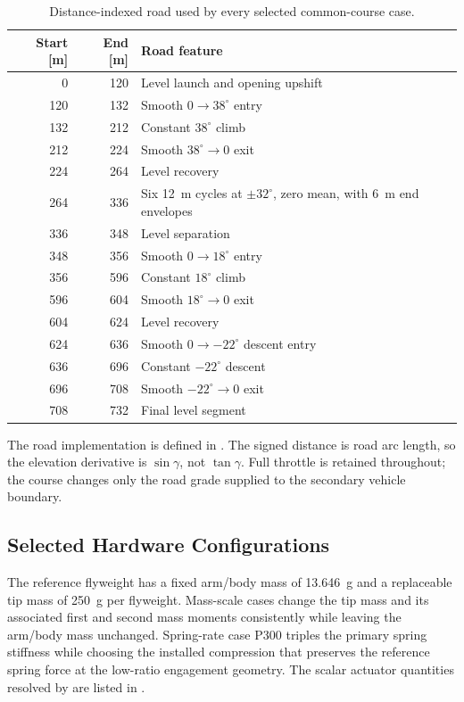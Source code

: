 \documentclass[11pt]{report}
\numberwithin{equation}{section}
\begin{document}
\begin{table}[H]
\centering
\small
\begin{tabular}{@{}r r p{}@{}}
\toprule
Start [m] & End [m] & Road feature \\
\midrule
0 & 120 & Level launch and opening upshift \\
120 & 132 & Smooth \(0\rightarrow38^\circ\) entry \\
132 & 212 & Constant \(38^\circ\) climb \\
212 & 224 & Smooth \(38^\circ\rightarrow0\) exit \\
224 & 264 & Level recovery \\
264 & 336 & Six \SI{12}{m} cycles at \(\pm32^\circ\), zero mean, with \SI{6}{m} end envelopes \\
336 & 348 & Level separation \\
348 & 356 & Smooth \(0\rightarrow18^\circ\) entry \\
356 & 596 & Constant \(18^\circ\) climb \\
596 & 604 & Smooth \(18^\circ\rightarrow0\) exit \\
604 & 624 & Level recovery \\
624 & 636 & Smooth \(0\rightarrow-22^\circ\) descent entry \\
636 & 696 & Constant \(-22^\circ\) descent \\
696 & 708 & Smooth \(-22^\circ\rightarrow0\) exit \\
708 & 732 & Final level segment \\
\bottomrule
\end{tabular}
\caption{Distance-indexed road used by every selected common-course case.}
\label{tab:course_profile}
\end{table}

The road implementation is defined in
.
The signed distance is road arc length, so the elevation derivative is
\(\sin\gamma\), not \(\tan\gamma\). Full throttle is retained throughout; the
course changes only the road grade supplied to the secondary vehicle boundary.

\subsection{Selected Hardware Configurations}
\label{app:course_configurations}

The reference flyweight has a fixed arm/body mass of
\SI{13.646}{g} and a replaceable tip mass of \SI{250}{g} per flyweight.
Mass-scale cases change the tip mass and its associated first and second mass
moments consistently while leaving the arm/body mass unchanged. Spring-rate
case P300 triples the primary spring stiffness while choosing the installed
compression that preserves the reference spring force at the low-ratio
engagement geometry. The scalar actuator quantities resolved by
 are
listed in .
\end{document}
